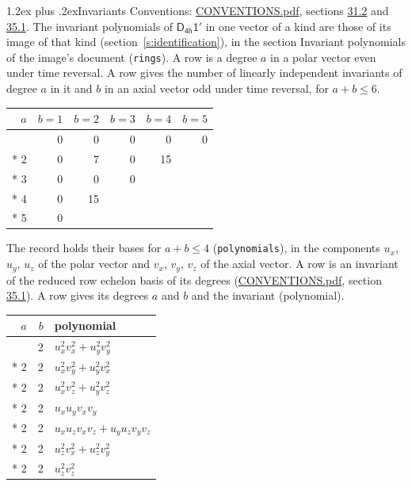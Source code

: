 \documentclass[10pt,a4paper]{article}
\makeatletter
\renewcommand\section{\@startsection{section}{1}{\z@}{-3ex plus -1ex minus -.2ex}%
  {1.2ex plus .2ex}{\normalfont\large\sffamily\bfseries\color{parttitle}}}
\numberwithin{equation}{section}
\newcommand{\grp}[1]{\mathsf{#1}}
\makeatother
\begin{document}
\section{Invariants}\label{s:invariants}
Conventions: \href{../../CONVENTIONS.pdf}{CONVENTIONS.pdf}, sections \href{../../CONVENTIONS.pdf\#conv.31.2}{31.2} and \href{../../CONVENTIONS.pdf\#conv.35.1}{35.1}.
The invariant polynomials of $\grp{D_{4h}1'}$ in one vector of a kind are those of its image of that kind (section~\ref{s:identification}), in the section Invariant polynomials of the image's document (\texttt{rings}).
\leavevmode\label{n:index.degree.polar}\label{n:index.degree.axial}A row is a degree $a$ in a polar vector even under time reversal. A row gives the number of linearly independent invariants of degree $a$ in it and $b$ in an axial vector odd under time reversal, for $a + b \le 6$.
{\small\begin{longtable}{@{}rrrrrr@{}}\toprule
$a$ & $b = 1$ & $b = 2$ & $b = 3$ & $b = 4$ & $b = 5$\\\midrule\endhead
\bottomrule\endfoot\endlastfoot
1 & 0 & 0 & 0 & 0 & 0\\*
2 & 0 & 7 & 0 & 15 & \\*
3 & 0 & 0 & 0 &  & \\*
4 & 0 & 15 &  &  & \\*
5 & 0 &  &  &  & \\
\bottomrule\end{longtable}}
\leavevmode\label{n:local.component.polar}\label{n:local.component.axial}The record holds their bases for $a + b \le 4$ (\texttt{polynomials}), in the components $u_{x}$, $u_{y}$, $u_{z}$ of the polar vector and $v_{x}$, $v_{y}$, $v_{z}$ of the axial vector. \label{n:head.polynomial}A row is an invariant of the reduced row echelon basis of its degrees (\href{../../CONVENTIONS.pdf}{CONVENTIONS.pdf}, section \href{../../CONVENTIONS.pdf\#conv.35.1}{35.1}). A row gives its degrees $a$ and $b$ and the invariant (polynomial).
{\small\renewcommand{\arraystretch}{1.2}\begin{longtable}{@{}rrl@{}}\toprule
$a$ & $b$ & polynomial\\\midrule\endhead
\bottomrule\endfoot\endlastfoot
2 & 2 & $u_{x}^{2}v_{x}^{2} + u_{y}^{2}v_{y}^{2}$\\*
2 & 2 & $u_{x}^{2}v_{y}^{2} + u_{y}^{2}v_{x}^{2}$\\*
2 & 2 & $u_{x}^{2}v_{z}^{2} + u_{y}^{2}v_{z}^{2}$\\*
2 & 2 & $u_{x}u_{y}v_{x}v_{y}$\\*
2 & 2 & $u_{x}u_{z}v_{x}v_{z} + u_{y}u_{z}v_{y}v_{z}$\\*
2 & 2 & $u_{z}^{2}v_{x}^{2} + u_{z}^{2}v_{y}^{2}$\\*
2 & 2 & $u_{z}^{2}v_{z}^{2}$\\
\bottomrule\end{longtable}}
\end{document}
